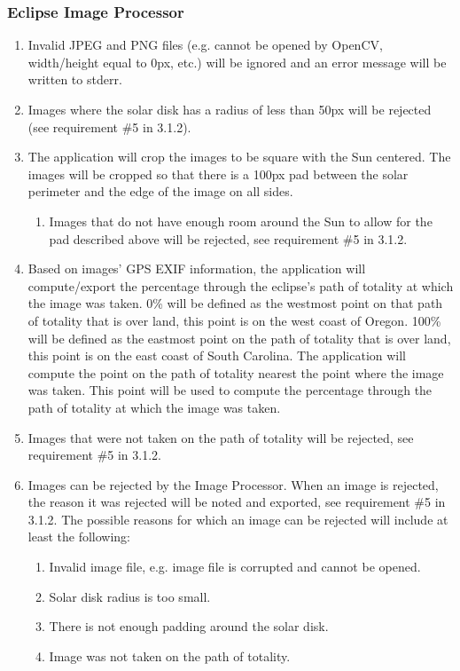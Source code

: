 \documentclass[10pt, onecolumn, draftclsnofoot, letterpaper, compsoc]{IEEEtran}
\begin{document}
\subsubsection{Eclipse Image Processor}
	\begin{enumerate}
		\item Invalid JPEG and PNG files (e.g. cannot be opened by OpenCV,
		width/height equal to 0px, etc.) will be ignored and an error message
		will be written to stderr.

		\item Images where the solar disk has a radius of less than 50px
		will be rejected (see requirement \#5 in 3.1.2).

		\item The application will crop the images to be square with the
		Sun centered. The images will be cropped so that there is a 100px
		pad between the solar perimeter and the edge of the image on all
		sides.
		\begin{enumerate}
			\item Images that do not have enough room around the Sun to
			allow for the pad described above will be rejected, see requirement \#5 in 3.1.2.
		\end{enumerate}

		\item Based on images' GPS EXIF information, the application will
		compute/export the percentage through the eclipse's path of
		totality at which the image was taken. 0\% will be defined as the
		westmost point on that path of totality that is over land, this
		point is on the west coast of Oregon. 100\% will be defined as the
		eastmost point on the path of totality that is over land, this
		point is on the east coast of South Carolina. The application will
		compute the point on the path of totality nearest the point where
		the image was taken. This point will be used to compute the
		percentage through the path of totality at which the image was
		taken.

		\item Images  that were not taken on the path of
		totality will be rejected, see requirement \#5 in 3.1.2.

		\item Images can be rejected by the Image Processor. When an image is rejected,
		the reason it was rejected will be noted and exported, see requirement \#5 in 3.1.2.
		The possible reasons for which an image can be rejected will include at least the
		following:
		\begin{enumerate}
			\item Invalid image file, e.g. image file is corrupted and cannot be opened.

			\item Solar disk radius is too small.

			\item There is not enough padding around the solar disk.

			\item Image was not taken on the path of totality.
		\end{enumerate}

	\end{enumerate}
\end{document}
